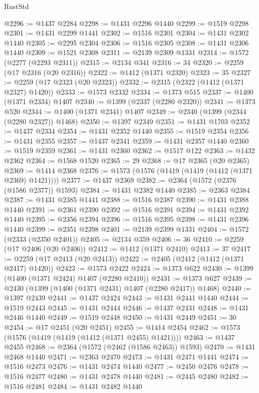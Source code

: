\begin{lexlean}{RustStd}
\begin{coremodule}
@2296 := @1437 @2284
@2298 := @1431 @2296 @1440
@2299 := @1519 @2298
@2301 := @1431 @2299 @1441
@2302 := @1516 @2301
@2304 := @1431 @2302 @1440
@2305 := @2295 @2304
@2306 := @1516 @2305
@2308 := @1431 @2306 @1440
@2309 := @1521 @2308
@2311 := @2139 @2309 @1331
@2314 := @1572 (@2277 (@2293 @2311))
@2315 := @2134 @341
@2316 := 34
@2320 := @2259 (@17 @2316 (@20 @2316))
@2322 := @1412 (@1371 @2320)
@2323 := 35
@2327 := @2259 (@17 @2323 (@20 @2323))
@2332 := @2315 (@2322 (@1412 (@1371 @2327) @1420))
@2333 := @1573 @2332
@2334 := @1373 @515
@2337 := @1400 (@1371 @2334) @1407
@2340 := @1399 (@2337 (@2280 @2320))
@2341 := @1373 @520
@2344 := @1400 (@1371 @2341) @1407
@2349 := @2340 (@1399 (@2344 (@2280 @2327)) @1468)
@2350 := @1397 @2349
@2351 := @1431 @1703
@2352 := @1437 @2334
@2354 := @1431 @2352 @1440
@2355 := @1519 @2354
@2356 := @1431 @2355
@2357 := @1437 @2341
@2359 := @1431 @2357 @1440
@2360 := @1519 @2359
@2361 := @1431 @2360
@2362 := @1517 @122
@2363 := @1432 @2362
@2364 := @1568 @1520
@2365 := 29
@2368 := @17 @2365 (@20 @2365)
@2369 := @1414 @2368
@2376 := @1573 (@1576 (@1419 (@1419 (@1412 (@1371 @2369) @1421))))
@2377 := @1437 @2369
@2382 := @2364 (@1572 (@2376 (@1586 @2377)) @1593)
@2384 := @1431 @2382 @1440
@2385 := @2363 @2384
@2387 := @1431 @2385 @1441
@2388 := @1516 @2387
@2390 := @1431 @2388 @1440
@2391 := @2361 @2390
@2392 := @1516 @2391
@2394 := @1431 @2392 @1440
@2395 := @2356 @2394
@2396 := @1516 @2395
@2398 := @1431 @2396 @1440
@2399 := @2351 @2398
@2401 := @2139 @2399 @1331
@2404 := @1572 (@2333 (@2350 @2401))
@2405 := @2134 @359
@2406 := 36
@2410 := @2259 (@17 @2406 (@20 @2406))
@2412 := @1412 (@1371 @2410)
@2413 := 37
@2417 := @2259 (@17 @2413 (@20 @2413))
@2422 := @2405 (@2412 (@1412 (@1371 @2417) @1420))
@2423 := @1573 @2422
@2424 := @1373 @622
@2430 := @1399 (@1400 (@1371 @2424) @1407 (@2280 @2410))
@2431 := @1373 @627
@2439 := @2430 (@1399 (@1400 (@1371 @2431) @1407 (@2280 @2417)) @1468)
@2440 := @1397 @2439
@2441 := @1437 @2424
@2443 := @1431 @2441 @1440
@2444 := @1519 @2443
@2445 := @1431 @2444
@2446 := @1437 @2431
@2448 := @1431 @2446 @1440
@2449 := @1519 @2448
@2450 := @1431 @2449
@2451 := 30
@2454 := @17 @2451 (@20 @2451)
@2455 := @1414 @2454
@2462 := @1573 (@1576 (@1419 (@1419 (@1412 (@1371 @2455) @1421))))
@2463 := @1437 @2455
@2468 := @2364 (@1572 (@2462 (@1586 @2463)) @1593)
@2470 := @1431 @2468 @1440
@2471 := @2363 @2470
@2473 := @1431 @2471 @1441
@2474 := @1516 @2473
@2476 := @1431 @2474 @1440
@2477 := @2450 @2476
@2478 := @1516 @2477
@2480 := @1431 @2478 @1440
@2481 := @2445 @2480
@2482 := @1516 @2481
@2484 := @1431 @2482 @1440

\end{coremodule}
\end{lexlean}
